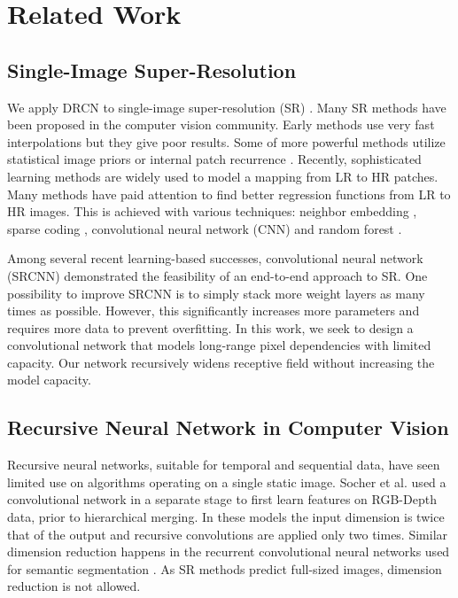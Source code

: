 \documentclass[10pt,twocolumn,letterpaper]{article}
\begin{document}
\section{Related Work}

\subsection{Single-Image Super-Resolution}

We apply DRCN to single-image super-resolution (SR) \cite{Irani1991, freeman2000learning,glasner2009super}. Many SR methods have been proposed in the computer vision community. Early methods use very fast interpolations but they give poor results. Some of more powerful methods utilize statistical image priors \cite{sun2008image,Kim2010} or internal patch recurrence \cite{glasner2009super, Huang-CVPR-2015}. Recently, sophisticated learning methods are widely used to model a mapping from LR to HR patches. Many methods have paid attention to find better regression functions from LR to HR images. This is achieved with various techniques: neighbor embedding \cite{chang2004super,bevilacqua2012}, sparse coding \cite{yang2010image,zeyde2012single,Timofte2013,Timofte}, convolutional neural network (CNN) \cite{dong2014image} and random forest \cite{schulter2015fast}.

Among several recent learning-based successes,  convolutional neural network (SRCNN) \cite{dong2014image} demonstrated the feasibility of an end-to-end approach to SR. One possibility to improve SRCNN is to simply stack more weight layers as many times as possible. However, this significantly increases more parameters and requires more data to prevent overfitting. In this work, we seek to design a convolutional network that models long-range pixel dependencies with limited capacity. Our network recursively widens receptive field without increasing the model capacity. 

\subsection{Recursive Neural Network in Computer Vision}

Recursive neural networks, suitable for temporal and sequential data, have seen limited use on algorithms operating on a single static image.   Socher et al.  \cite{socher2012convolutional} used a convolutional network in a separate stage to first learn features on RGB-Depth data, prior to hierarchical merging. In these models the input dimension is twice that of the output and recursive convolutions are applied only two times. Similar dimension reduction happens in the recurrent convolutional neural networks used for semantic segmentation \cite{pinheiro2014recurrent}. As SR methods predict full-sized images, dimension reduction is not allowed.
\end{document}
